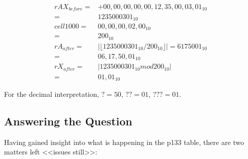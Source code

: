 \documentclass{article}
\begin{document}
\begin{align*}
    rAX_{before} = &+00,00,00,00,00,12,35,00,03,01_{10} \\
    = &1235000301_{10} \\
    cell1000 = &00,00,00,02,00_{10} \\
    = &200_{10} \\
    rA_{after} = &| \lfloor 1235000301_{10} / 200_{10} \rfloor | = 6175001_{10} \\
    = & 06,17,50,01_{10} \\
    rX_{after} = &| 1235000301_{10} mod 200_{10} | \\
    = & 01,01_{10}
\end{align*}

For the decimal interpretation, $? = 50$, $?? = 01$, $??? = 01$.

\subsection*{Answering the Question}

Having gained insight into what is happening in the p133 table,
there are two matters left <<issues still>>: 
\end{document}
